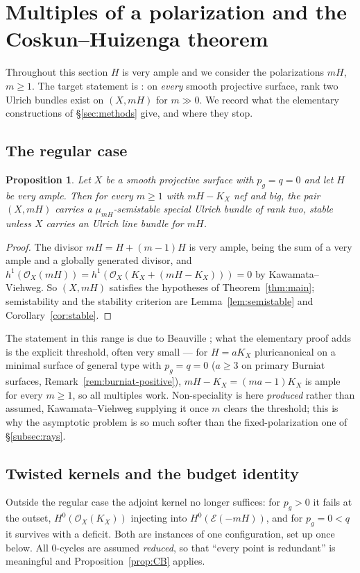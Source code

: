 \documentclass[10pt,a4paper]{amsart}
\newtheorem{proposition}[theorem]{Proposition}
\newcommand{\OO}{\mathcal{O}}
\newcommand{\EE}{\mathcal{E}}
\begin{document}
\section{Multiples of a polarization and the Coskun--Huizenga theorem}\label{sec:asymptotic}

Throughout this section $H$ is very ample and we consider the polarizations $mH$, $m\ge1$. The target statement is \cite[Thm.~1.2]{CH20}: on \emph{every} smooth projective surface, rank two Ulrich bundles exist on $(X,mH)$ for $m\gg0$. We record what the elementary constructions of \S\ref{sec:methods} give, and where they stop.

\subsection{The regular case}\label{subsec:asymptotic-reg}

\begin{proposition}\label{prop:asymptotic}
Let $X$ be a smooth projective surface with $p_g=q=0$ and let $H$ be very ample. Then for every $m\ge1$ with $mH-K_X$ nef and big, the pair $(X,mH)$ carries a $\mu_{mH}$-semistable special Ulrich bundle of rank two, stable unless $X$ carries an Ulrich line bundle for $mH$.
\end{proposition}

\begin{proof}
The divisor $mH=H+(m-1)H$ is very ample, being the sum of a very ample and a globally generated divisor, and $h^1(\OO_X(mH))=h^1(\OO_X(K_X+(mH-K_X)))=0$ by Kawamata--Viehweg. So $(X,mH)$ satisfies the hypotheses of Theorem~\ref{thm:main}; semistability and the stability criterion are Lemma~\ref{lem:semistable} and Corollary~\ref{cor:stable}.
\end{proof}

The statement in this range is due to Beauville \cite{Bea16b}; what the elementary proof adds is the explicit threshold, often very small --- for $H=aK_X$ pluricanonical on a minimal surface of general type with $p_g=q=0$ \textup{(}$a\ge3$ on primary Burniat surfaces, Remark~\ref{rem:burniat-positive}\textup{)}, $mH-K_X=(ma-1)K_X$ is ample for every $m\ge1$, so all multiples work. Non-speciality is here \emph{produced} rather than assumed, Kawamata--Viehweg supplying it once $m$ clears the threshold; this is why the asymptotic problem is so much softer than the fixed-polarization one of \S\ref{subsec:rays}.

\subsection{Twisted kernels and the budget identity}\label{subsec:pg}
Outside the regular case the adjoint kernel no longer suffices: for $p_g>0$ it fails at the outset, $H^0(\OO_X(K_X))$ injecting into $H^0(\EE(-mH))$, and for $p_g=0<q$ it survives with a deficit. Both are instances of one configuration, set up once below. All $0$-cycles are assumed \emph{reduced}, so that ``every point is redundant'' is meaningful and Proposition~\ref{prop:CB} applies.
\end{document}
